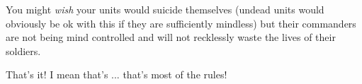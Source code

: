 \documentclass[letterpaper,twocolumn,openany,nodeprecatedcode]{dndbook}
\begin{document}
You might \textit{wish} your units would suicide themselves (undead units would obviously be ok with this if they are sufficiently mindless) but their commanders are not being mind controlled and will not recklessly waste the lives of their soldiers.

That’s it! I mean that’s ... that’s most of the rules!







\end{document}
